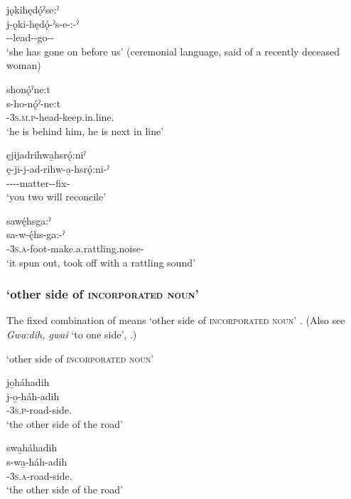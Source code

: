\ex jǫkihędǫ́ˀse:ˀ\\
\gll j-ǫki-hędǫ́-ˀs-e-:-ˀ\\
{\repetitive}--lead-{\dislocative}-go-{\purposive}-{\stative}\\
\glt `she has gone on before us' (ceremonial language, said of a recently deceased woman)

\ex shonǫ́ˀne:t\\
\gll s-ho-nǫ́ˀ-ne:t\\
{\repetitive}-\textsc{3s.m.p}-head-keep.in.line.{\stative}\\
\glt `he is behind him, he is next in line'

\ex ęjijadrihwa̱hsrǫ́:niˀ\\
\gll ę-ji-j-ad-rihw-a̱-hsrǫ́:ni-ˀ\\
\fut-{\repetitive}--{\semireflexive}-matter-{\joinerA}-fix-{\punctual}\\
\glt `you two will reconcile'

\ex sawę́hsga:ˀ\\
\gll sa-w-ę́hs-ga:-ˀ\\
{\repetitive}-\textsc{3s.a}-foot-make.a.rattling.noise-{\punctual}\\
\glt `it spun out, took off with a rattling sound'
\z
\z

\subsubsection*{ ‘other side of \textsc{incorporated noun}’} \label{[s/j/ji-pronominal prefix-incorporated noun-adih]}
The fixed combination of  means ‘other side of \textsc{incorporated noun}’ . (Also see \textit{Gwa:dih, gwai} ‘to one side’, .)

\ea\label{ex:pppexpressionex10}  ‘other side of \textsc{incorporated noun}’

\ea jo̱háhadih\\
\gll j-o̱-háh-adih\\
{\repetitive}-\textsc{3s.p}-road-side.{\stative}\\
\glt `the other side of the road'

\ex swa̱háhadih\\
\gll s-wa̱-háh-adih\\
{\repetitive}-\textsc{3s.a}-road-side.{\stative}\\
\glt `the other side of the road'
\z
\z



